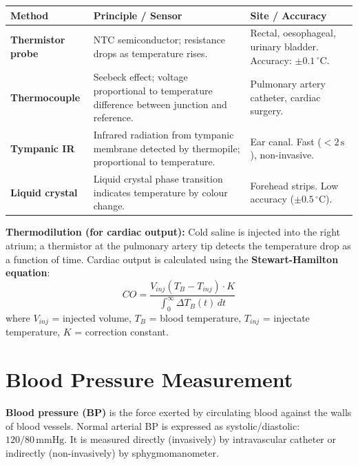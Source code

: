 \documentclass[12pt,a4paper]{article}
\begin{document}
\par\noindent
\begin{tabularx}{\linewidth}{|B{3.0cm}|Y|Y|}
\hline
\textbf{Method} & \textbf{\color{myteal}Principle / Sensor} & \textbf{\color{mygreen}Site / Accuracy} \\
\hline
\textbf{Thermistor probe} & NTC semiconductor; resistance drops as temperature rises. & Rectal, oesophageal, urinary bladder. Accuracy: $\pm 0.1\,^{\circ}$C. \\
\hline
\textbf{Thermocouple} & Seebeck effect; voltage proportional to temperature difference between junction and reference. & Pulmonary artery catheter, cardiac surgery. \\
\hline
\textbf{Tympanic IR} & Infrared radiation from tympanic membrane detected by thermopile; proportional to temperature. & Ear canal. Fast ($<2\,\text{s}$), non-invasive. \\
\hline
\textbf{Liquid crystal} & Liquid crystal phase transition indicates temperature by colour change. & Forehead strips. Low accuracy ($\pm 0.5\,^{\circ}$C). \\
\hline
\end{tabularx}

\textbf{Thermodilution (for cardiac output):} Cold saline is injected into the right atrium; a thermistor at the pulmonary artery tip detects the temperature drop as a function of time. Cardiac output is calculated using the \textbf{Stewart-Hamilton equation}:
\[
CO = \frac{V_{inj}(T_B - T_{inj}) \cdot K}{\int_0^\infty \Delta T_B(t)\,dt}
\]
where $V_{inj}$ = injected volume, $T_B$ = blood temperature, $T_{inj}$ = injectate temperature, $K$ = correction constant.

\section{Blood Pressure Measurement}

\begin{tcolorbox}[defbox, title={\textbf{Blood Pressure}}]
\textbf{Blood pressure (BP)} is the force exerted by circulating blood against the walls of blood vessels. Normal arterial BP is expressed as systolic/diastolic: $120/80\,\text{mmHg}$. It is measured directly (invasively) by intravascular catheter or indirectly (non-invasively) by sphygmomanometer.
\end{tcolorbox}
\end{document}
